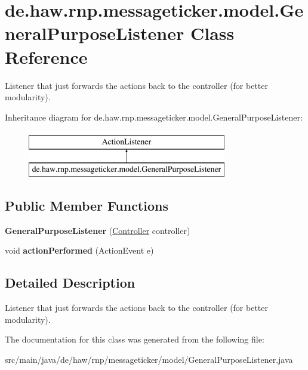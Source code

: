 \hypertarget{classde_1_1haw_1_1rnp_1_1messageticker_1_1model_1_1GeneralPurposeListener}{\section{de.\-haw.\-rnp.\-messageticker.\-model.\-General\-Purpose\-Listener Class Reference}
\label{classde_1_1haw_1_1rnp_1_1messageticker_1_1model_1_1GeneralPurposeListener}
}


Listener that just forwards the actions back to the controller (for better modularity).  


Inheritance diagram for de.\-haw.\-rnp.\-messageticker.\-model.\-General\-Purpose\-Listener\-:\begin{figure}[H]
\begin{center}
\leavevmode
\includegraphics[height=2.000000cm]{classde_1_1haw_1_1rnp_1_1messageticker_1_1model_1_1GeneralPurposeListener}
\end{center}
\end{figure}
\subsection*{Public Member Functions}
\begin{DoxyCompactItemize}
\item 
\hypertarget{classde_1_1haw_1_1rnp_1_1messageticker_1_1model_1_1GeneralPurposeListener_afb387410079c4b47f9fcbb301da7e972}{{\bfseries General\-Purpose\-Listener} (\hyperlink{classde_1_1haw_1_1rnp_1_1messageticker_1_1Controller}{Controller} controller)}\label{classde_1_1haw_1_1rnp_1_1messageticker_1_1model_1_1GeneralPurposeListener_afb387410079c4b47f9fcbb301da7e972}

\item 
\hypertarget{classde_1_1haw_1_1rnp_1_1messageticker_1_1model_1_1GeneralPurposeListener_a70a06b0de2550eab21afd2637e4beaeb}{void {\bfseries action\-Performed} (Action\-Event e)}\label{classde_1_1haw_1_1rnp_1_1messageticker_1_1model_1_1GeneralPurposeListener_a70a06b0de2550eab21afd2637e4beaeb}

\end{DoxyCompactItemize}


\subsection{Detailed Description}
Listener that just forwards the actions back to the controller (for better modularity). 

The documentation for this class was generated from the following file\-:\begin{DoxyCompactItemize}
\item 
src/main/java/de/haw/rnp/messageticker/model/General\-Purpose\-Listener.\-java\end{DoxyCompactItemize}
